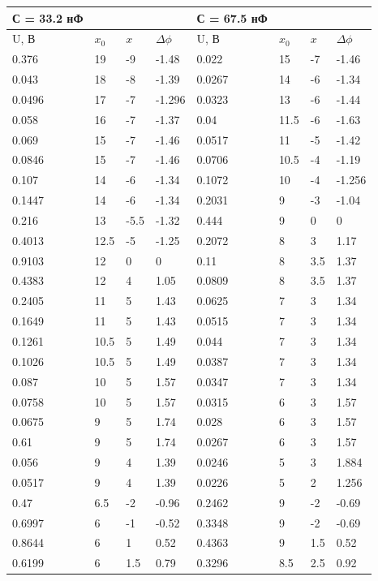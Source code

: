 \documentclass[a4paper, 12pt]{article}
\begin{document}
\newpage
\begin{table}[!ht]
    \centering
    \begin{tabular}{|l|l|l|l|l|l|l|l|}
    \hline
        С = 33.2 нФ & ~ & ~ & ~ & С = 67.5 нФ & ~ & ~ & ~ \\ \hline
        U, В & $x_0$ & $x$  & $\Delta \phi$ & U, В & $x_0$ & $x$  & $\Delta \phi$ \\ \hline
        0.376 & 19 & -9 & -1.48 & 0.022 & 15 & -7 & -1.46 \\ \hline
        0.043 & 18 & -8 & -1.39 & 0.0267 & 14 & -6 & -1.34 \\ \hline
        0.0496 & 17 & -7 & -1.296 & 0.0323 & 13 & -6 & -1.44 \\ \hline
        0.058 & 16 & -7 & -1.37 & 0.04 & 11.5 & -6 & -1.63 \\ \hline
        0.069 & 15 & -7 & -1.46 & 0.0517 & 11 & -5 & -1.42 \\ \hline
        0.0846 & 15 & -7 & -1.46 & 0.0706 & 10.5 & -4 & -1.19 \\ \hline
        0.107 & 14 & -6 & -1.34 & 0.1072 & 10 & -4 & -1.256 \\ \hline
        0.1447 & 14 & -6 & -1.34 & 0.2031 & 9 & -3 & -1.04 \\ \hline
        0.216 & 13 & -5.5 & -1.32 & 0.444 & 9 & 0 & 0 \\ \hline
        0.4013 & 12.5 & -5 & -1.25 & 0.2072 & 8 & 3 & 1.17 \\ \hline
        0.9103 & 12 & 0 & 0 & 0.11 & 8 & 3.5 & 1.37 \\ \hline
        0.4383 & 12 & 4 & 1.05 & 0.0809 & 8 & 3.5 & 1.37 \\ \hline
        0.2405 & 11 & 5 & 1.43 & 0.0625 & 7 & 3 & 1.34 \\ \hline
        0.1649 & 11 & 5 & 1.43 & 0.0515 & 7 & 3 & 1.34 \\ \hline
        0.1261 & 10.5 & 5 & 1.49 & 0.044 & 7 & 3 & 1.34 \\ \hline
        0.1026 & 10.5 & 5 & 1.49 & 0.0387 & 7 & 3 & 1.34 \\ \hline
        0.087 & 10 & 5 & 1.57 & 0.0347 & 7 & 3 & 1.34 \\ \hline
        0.0758 & 10 & 5 & 1.57 & 0.0315 & 6 & 3 & 1.57 \\ \hline
        0.0675 & 9 & 5 & 1.74 & 0.028 & 6 & 3 & 1.57 \\ \hline
        0.61 & 9 & 5 & 1.74 & 0.0267 & 6 & 3 & 1.57 \\ \hline
        0.056 & 9 & 4 & 1.39 & 0.0246 & 5 & 3 & 1.884 \\ \hline
        0.0517 & 9 & 4 & 1.39 & 0.0226 & 5 & 2 & 1.256 \\ \hline
        0.47 & 6.5 & -2 & -0.96 & 0.2462 & 9 & -2 & -0.69 \\ \hline
        0.6997 & 6 & -1 & -0.52 & 0.3348 & 9 & -2 & -0.69 \\ \hline
        0.8644 & 6 & 1 & 0.52 & 0.4363 & 9 & 1.5 & 0.52 \\ \hline
        0.6199 & 6 & 1.5 & 0.79 & 0.3296 & 8.5 & 2.5 & 0.92 \\ \hline
    \end{tabular}
\end{table}
\end{document}
